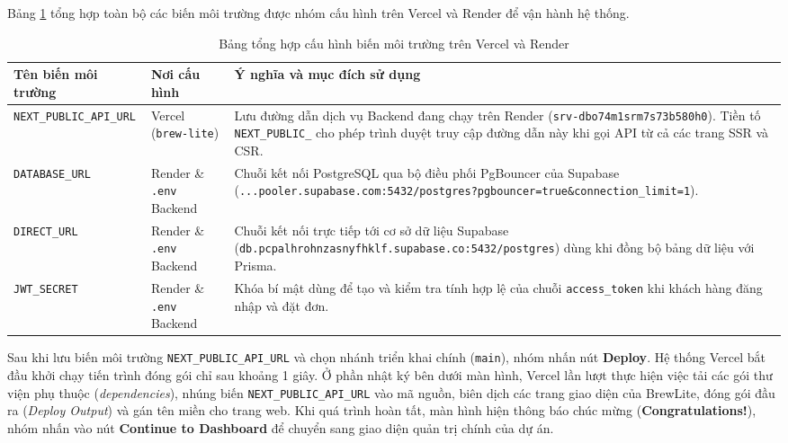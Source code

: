 Bảng \ref{tab:env-summary} tổng hợp toàn bộ các biến môi trường được nhóm cấu hình trên Vercel và Render để vận hành hệ thống.

\begin{table}[H]
\centering
\caption{Bảng tổng hợp cấu hình biến môi trường trên Vercel và Render}
\vspace{0.2cm}
\begin{tabular}{|p{4.4cm}|p{2.8cm}|p{7.7cm}|}
\hline
\textbf{Tên biến môi trường} & \textbf{Nơi cấu hình} & \textbf{Ý nghĩa và mục đích sử dụng} \\ \hline
\texttt{NEXT\_PUBLIC\_API\_URL} & Vercel \newline (\texttt{brew-lite}) & Lưu đường dẫn dịch vụ Backend đang chạy trên Render (\texttt{srv-dbo74m1srm7s73b580h0}). Tiền tố \texttt{NEXT\_PUBLIC\_} cho phép trình duyệt truy cập đường dẫn này khi gọi API từ cả các trang SSR và CSR. \\ \hline
\texttt{DATABASE\_URL} & Render \& \texttt{.env} Backend & Chuỗi kết nối PostgreSQL qua bộ điều phối PgBouncer của Supabase (\texttt{...pooler.supabase.com:5432/postgres?pgbouncer=true\&connection\_limit=1}). \\ \hline
\texttt{DIRECT\_URL} & Render \& \texttt{.env} Backend & Chuỗi kết nối trực tiếp tới cơ sở dữ liệu Supabase (\texttt{db.pcpalhrohnzasnyfhklf.supabase.co:5432/postgres}) dùng khi đồng bộ bảng dữ liệu với Prisma. \\ \hline
\texttt{JWT\_SECRET} & Render \& \texttt{.env} Backend & Khóa bí mật dùng để tạo và kiểm tra tính hợp lệ của chuỗi \texttt{access\_token} khi khách hàng đăng nhập và đặt đơn. \\ \hline
\end{tabular}
\label{tab:env-summary}
\end{table}

Sau khi lưu biến môi trường \texttt{NEXT\_PUBLIC\_API\_URL} và chọn nhánh triển khai chính (\texttt{main}), nhóm nhấn nút \textbf{Deploy}. Hệ thống Vercel bắt đầu khởi chạy tiến trình đóng gói chỉ sau khoảng 1 giây. Ở phần nhật ký bên dưới màn hình, Vercel lần lượt thực hiện việc tải các gói thư viện phụ thuộc (\textit{dependencies}), nhúng biến \texttt{NEXT\_PUBLIC\_API\_URL} vào mã nguồn, biên dịch các trang giao diện của BrewLite, đóng gói đầu ra (\textit{Deploy Output}) và gán tên miền cho trang web. Khi quá trình hoàn tất, màn hình hiện thông báo chúc mừng (\textbf{Congratulations!}), nhóm nhấn vào nút \textbf{Continue to Dashboard} để chuyển sang giao diện quản trị chính của dự án.

